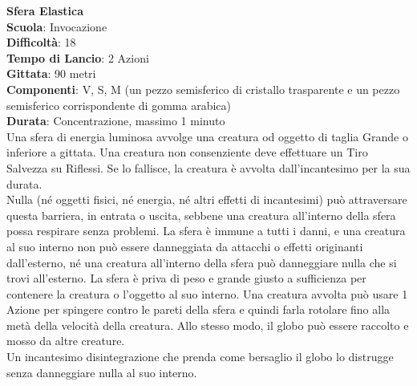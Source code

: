 \begin{multicols}{2}
\medskip\textbf{Sfera Elastica}\\
\textbf{Scuola}: Invocazione\\
\textbf{Difficoltà}: 18\\
\textbf{Tempo di Lancio}: 2 Azioni\\
\textbf{Gittata}: 90 metri\\
\textbf{Componenti}: V, S, M (un pezzo semisferico di cristallo trasparente e un pezzo semisferico corrispondente di gomma arabica)\\
\textbf{Durata}: Concentrazione, massimo 1 minuto\\
Una sfera di energia luminosa avvolge una creatura od oggetto di taglia Grande o inferiore a gittata. Una creatura non consenziente deve effettuare un Tiro Salvezza su Riflessi. Se lo fallisce, la creatura è avvolta dall'incantesimo per la sua durata.\\
Nulla (né oggetti fisici, né energia, né altri effetti di incantesimi) può attraversare questa barriera, in entrata o uscita, sebbene una creatura all'interno della sfera possa respirare senza problemi. La sfera è immune a tutti i danni, e una creatura al suo interno non può essere danneggiata da attacchi o effetti originanti dall'esterno, né una creatura all'interno della sfera può danneggiare nulla che si trovi all'esterno. La sfera è priva di peso e grande giusto a sufficienza per contenere la creatura o l'oggetto al suo interno. Una creatura avvolta può usare 1 Azione per spingere contro le pareti della sfera e quindi farla rotolare fino alla metà della velocità della creatura. Allo stesso modo, il globo può essere raccolto e mosso da altre creature.\\
Un incantesimo disintegrazione che prenda come bersaglio il globo lo distrugge senza danneggiare nulla al suo interno.


\end{multicols}
